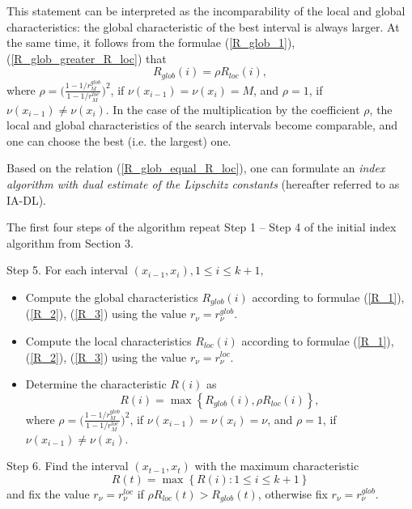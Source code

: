 \documentclass[preprint]{elsarticle}
\begin{document}
	This statement can be interpreted as the incomparability of the local and global characteristics: the global characteristic of the best interval is always larger. At the same time, it follows from the formulae (\ref{R_glob_1}), (\ref{R_glob_greater_R_loc}) that 
\begin{equation}\label{R_glob_equal_R_loc}
	R_{glob}(i) = \rho R_{loc}(i),
\end{equation}
where $\rho=\Big(\frac{1-1/r_{M}^{glob}}{1-1/r_{M}^{loc}}\Big)^2$, if $\nu(x_{i-1})=\nu(x_i)=M$, and $\rho=1$, if $\nu(x_{i-1}) \neq \nu(x_i)$. In the case of the multiplication by the coefficient $\rho$, the local and global characteristics of the search intervals become comparable, and one can choose the best (i.e. the largest) one.

	Based on the relation (\ref{R_glob_equal_R_loc}), one can formulate an \textit{index algorithm with dual estimate of the Lipschitz constants} (hereafter referred to as IA-DL).
	
	The first four steps of the algorithm repeat Step 1 -- Step 4 of the initial index algorithm from Section 3.
	
	Step 5. For each interval $(x_{i-1}, x_i), 1 \leq i \leq k+1,$ 
\begin{flushleft}
	\begin{itemize}[]
		\item Compute the global characteristics $R_{glob}(i)$ according to formulae (\ref{R_1}), (\ref{R_2}), (\ref{R_3}) using the value $r_{\nu}=r_{\nu}^{glob}$.
		\item Compute the local characteristics $R_{loc}(i)$ according to formulae (\ref{R_1}), (\ref{R_2}), (\ref{R_3}) using the value $r_{\nu}=r_{\nu}^{loc}$.
		\item Determine the characteristic $R(i)$ as
\begin{equation}\label{R_max}
	R(i) = \max{\left\{ R_{glob}(i), \rho R_{loc}(i) \right\}},
\end{equation}
where $\rho=\Big(\frac{1-1/r_{M}^{glob}}{1-1/r_{M}^{loc}}\Big)^2$, if $\nu(x_{i-1})=\nu(x_i)=\nu$, and $\rho=1$, if $\nu(x_{i-1}) \neq \nu(x_i)$.
	\end{itemize}
\end{flushleft}

	Step 6. Find the interval $(x_{t-1}, x_t)$ with the maximum characteristic
\begin{equation}\label{R_max_t}
	R(t) = \max{\left\{ R(i): 1 \leq i \leq k+1\right\}}
\end{equation}
and fix the value $r_{\nu}=r_{\nu}^{loc}$ if $\rho R_{loc}(t) > R_{glob}(t)$, otherwise fix $r_{\nu}=r_{\nu}^{glob}$.
\end{document}
